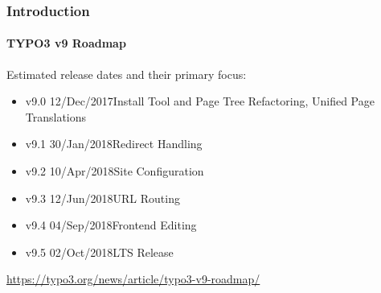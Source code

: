 \begin{frame}[fragile]
	\frametitle{Introduction}
	\framesubtitle{TYPO3 v9 Roadmap}

	Estimated release dates and their primary focus:

	\begin{itemize}

		\item v9.0 \tabto{1.1cm}12/Dec/2017\tabto{3.4cm}Install Tool and Page Tree Refactoring,\newline
			\tabto{3.4cm}Unified Page Translations
		\item
			\begingroup
				\color{typo3orange}
					v9.1 \tabto{1.1cm}30/Jan/2018\tabto{3.4cm}Redirect Handling
			\endgroup
		\item v9.2 \tabto{1.1cm}10/Apr/2018\tabto{3.4cm}Site Configuration
		\item v9.3 \tabto{1.1cm}12/Jun/2018\tabto{3.4cm}URL Routing
		\item v9.4 \tabto{1.1cm}04/Sep/2018\tabto{3.4cm}Frontend Editing
		\item v9.5 \tabto{1.1cm}02/Oct/2018\tabto{3.4cm}LTS Release

	\end{itemize}

	\smaller
		\url{https://typo3.org/news/article/typo3-v9-roadmap/}
	\normalsize

\end{frame}

